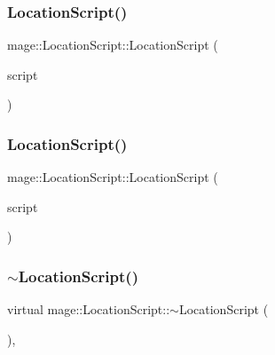 \subsubsection{\texorpdfstring{Location\+Script()}{LocationScript()}\hspace{0.1cm}{\footnotesize\ttfamily [2/3]}}
{\footnotesize\ttfamily mage\+::\+Location\+Script\+::\+Location\+Script (\begin{DoxyParamCaption}\item[{const \hyperlink{classmage_1_1_location_script}{Location\+Script} \&}]{script }\end{DoxyParamCaption})\hspace{0.3cm}{\ttfamily [delete]}}

\hypertarget{classmage_1_1_location_script_accb7888321a94d093634e10360f9d659}{}\label{classmage_1_1_location_script_accb7888321a94d093634e10360f9d659} 
\subsubsection{\texorpdfstring{Location\+Script()}{LocationScript()}\hspace{0.1cm}{\footnotesize\ttfamily [3/3]}}
{\footnotesize\ttfamily mage\+::\+Location\+Script\+::\+Location\+Script (\begin{DoxyParamCaption}\item[{\hyperlink{classmage_1_1_location_script}{Location\+Script} \&\&}]{script }\end{DoxyParamCaption})\hspace{0.3cm}{\ttfamily [default]}}

\hypertarget{classmage_1_1_location_script_ae51f38f597f34536a80ca6b08d044811}{}\label{classmage_1_1_location_script_ae51f38f597f34536a80ca6b08d044811} 
\subsubsection{\texorpdfstring{$\sim$\+Location\+Script()}{~LocationScript()}}
{\footnotesize\ttfamily virtual mage\+::\+Location\+Script\+::$\sim$\+Location\+Script (\begin{DoxyParamCaption}{ }\end{DoxyParamCaption})\hspace{0.3cm}{\ttfamily [virtual]}, {\ttfamily [default]}}



